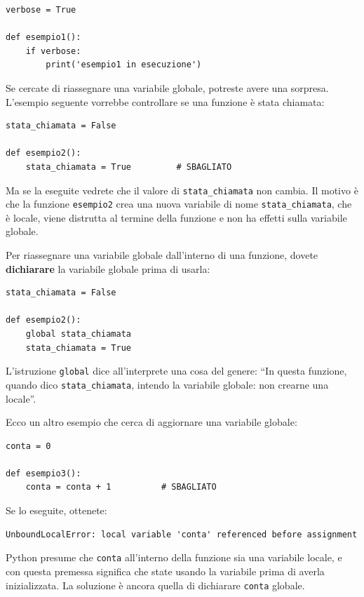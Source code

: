 \documentclass[10pt]{book}
\begin{document}
\begin{verbatim}
verbose = True

def esempio1():
    if verbose:
        print('esempio1 in esecuzione')
\end{verbatim}
%
Se cercate di riassegnare una variabile globale, potreste avere una sorpresa. L'esempio seguente vorrebbe controllare se una funzione è stata chiamata:

\begin{verbatim}
stata_chiamata = False

def esempio2():
    stata_chiamata = True         # SBAGLIATO
\end{verbatim}
%
Ma se la eseguite vedrete che il valore di \verb"stata_chiamata"
non cambia. Il motivo è che la funzione {\tt esempio2} crea una nuova variabile di nome \verb"stata_chiamata", che è locale, viene distrutta al termine della funzione e non ha effetti sulla variabile globale.

Per riassegnare una variabile globale dall'interno di una funzione, dovete
{\bf dichiarare} la variabile globale prima di usarla:

\begin{verbatim}
stata_chiamata = False

def esempio2():
    global stata_chiamata 
    stata_chiamata = True
\end{verbatim}
%
L'istruzione {\tt global} dice all'interprete una cosa del genere: ``In questa funzione, quando dico \verb"stata_chiamata", intendo la variabile globale: non crearne una locale''.

Ecco un altro esempio che cerca di aggiornare una variabile globale:

\begin{verbatim}
conta = 0

def esempio3():
    conta = conta + 1          # SBAGLIATO
\end{verbatim}
%
Se lo eseguite, ottenete:

\begin{verbatim}
UnboundLocalError: local variable 'conta' referenced before assignment
\end{verbatim}
%
Python presume che {\tt conta} all'interno della funzione sia una variabile locale, e con questa premessa significa che state usando la variabile prima di averla inizializzata. La soluzione è ancora quella di dichiarare {\tt conta} globale.
\end{document}
